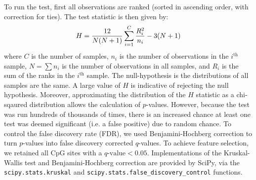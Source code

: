 \documentclass[draft]{article}
\newcommand{\equationname}[1]{%
    \begingroup
        \leavevmode
        \addcontentsline{equ}{equations}{\protect\numberline{\theequation}#1}%
    \endgroup   
}
\begin{document}
To run the test, first all observations are ranked (sorted in ascending order, with correction for ties). The test statistic is then given by:
\begin{equation} \equationname{Kruskal-Wallis test by ranks}
    H = \frac{12}{N(N + 1)}\sum_{i=1}^{C}\frac{R_i^2}{n_i} - 3(N + 1)
\end{equation}
where \(C\) is the number of samples, \(n_i\) is the number of observations in the \(i^\text{th}\) sample, \(N = \sum n_i\) is the number of observations in all samples, and \(R_i\) is the sum of the ranks in the \(i^\text{th}\) sample. The null-hypothesis is the distributions of all samples are the same. A large value of \(H\) is indicative of rejecting the null hypothesis. Moreover, approximating the distribution of the \(H\) statistic as a chi-sqaured distribution allows the calculation of \(p\)-values. However, because the test was run hundreds of thousands of times, there is an increased chance at least one test was deemed significant (i.e. a false positive) due to random chance. To control the false discovery rate (FDR), we used Benjamini-Hochberg correction \cite{benjamini1995controlling} to turn \(p\)-values into false discovery corrected \(q\)-values. To achieve feature selection, we retained all CpG sites with a \(q\text{-value} < 0.05\). Implementations of the Kruskal-Wallis test and Benjamini-Hochberg correction are provided by SciPy, via the \verb|scipy.stats.kruskal| and \verb|scipy.stats.false_discovery_control| functions.

\end{document}
